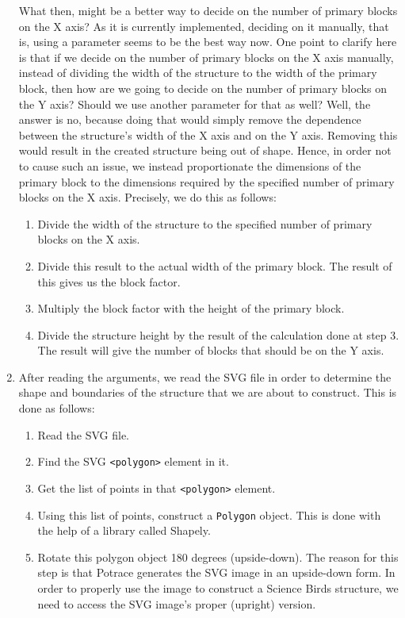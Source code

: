 \documentclass{dalthesis}
\begin{document}
\begin{enumerate}
  What then, might be a better way to decide on the number of primary blocks on the X axis? As it is currently implemented, deciding on it manually, that is, using a parameter seems to be the best way now. One point to clarify here is that if we decide on the number of primary blocks on the X axis manually, instead of dividing the width of the structure to the width of the primary block, then how are we going to decide on the number of primary blocks on the Y axis? Should we use another parameter for that as well? Well, the answer is no, because doing that would simply remove the dependence between the structure's width of the X axis and on the Y axis. Removing this would result in the created structure being out of shape. Hence, in order not to cause such an issue, we instead proportionate the dimensions of the primary block to the dimensions required by the specified number of primary blocks on the X axis. Precisely, we do this as follows:

  \begin{enumerate}
    \item Divide the width of the structure to the specified number of primary blocks on the X axis.

    \item Divide this result to the actual width of the primary block. The result of this gives us the block factor.

    \item Multiply the block factor with the height of the primary block.

    \item Divide the structure height by the result of the calculation done at step 3. The result will give the number of blocks that should be on the Y axis.
  \end{enumerate}

  \item After reading the arguments, we read the SVG file in order to determine the shape and boundaries of the structure that we are about to construct. This is done as follows:

  \begin{enumerate}
    \item Read the SVG file.
    \item Find the SVG \lstinline{<polygon>} element in it.
    \item Get the list of points in that \lstinline{<polygon>} element.
    \item Using this list of points, construct a \lstinline{Polygon} object. This is done with the help of a library called Shapely.
    \item Rotate this polygon object 180 degrees (upside-down). The reason for this step is that Potrace generates the SVG image in an upside-down form. In order to properly use the image to construct a Science Birds structure, we need to access the SVG image's proper (upright) version.
  \end{enumerate}


\end{enumerate}
\end{document}
